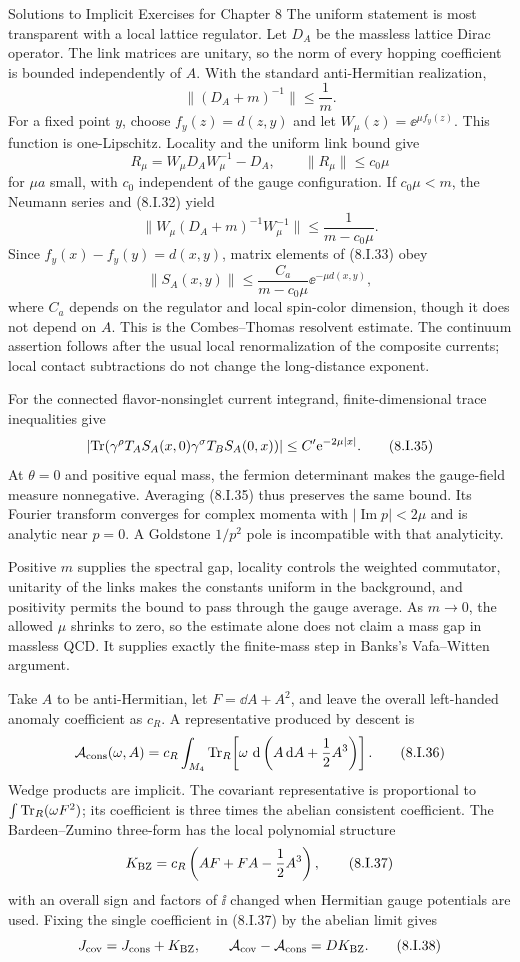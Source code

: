 \begin{bankssolutions}{Solutions to Implicit Exercises for Chapter 8}
The uniform statement is most transparent with a local lattice regulator.
Let $D_A$ be the massless lattice Dirac operator.  The link matrices are
unitary, so the norm of every hopping coefficient is bounded independently
of $A$.  With the standard anti-Hermitian realization,
\[
 \|(D_A+m)^{-1}\|\le\frac1m. \tag{8.I.32}
\]
For a fixed point $y$, choose $f_y(z)=d(z,y)$ and let
$W_\mu(z)=\ee^{\mu f_y(z)}$.  This function is one-Lipschitz.  Locality and
the uniform link bound give
\[
 R_\mu=W_\mu D_AW_\mu^{-1}-D_A,
 \qquad \|R_\mu\|\le c_0\mu
\]
for $\mu a$ small, with $c_0$ independent of the gauge configuration.  If
$c_0\mu<m$, the Neumann series and (8.I.32) yield
\[
 \|W_\mu(D_A+m)^{-1}W_\mu^{-1}\|
 \le\frac1{m-c_0\mu}. \tag{8.I.33}
\]
Since $f_y(x)-f_y(y)=d(x,y)$, matrix elements of (8.I.33) obey
\[
 \|S_A(x,y)\|\le\frac{C_a}{m-c_0\mu}
 \ee^{-\mu d(x,y)}, \tag{8.I.34}
\]
where $C_a$ depends on the regulator and local spin-color dimension, though
it does not depend on $A$.  This is the Combes--Thomas resolvent estimate.
The continuum assertion follows after the usual local renormalization of the
composite currents; local contact subtractions do not change the
long-distance exponent.

For the connected flavor-nonsinglet current integrand, finite-dimensional
trace inequalities give
\[
 \left|\operatorname{Tr}(\gamma^\rho T_AS_A(x,0)
 \gamma^\sigma T_BS_A(0,x))\right|
 \le C'\mathrm{e}^{-2\mu|x|}. \tag{8.I.35}
\]
At $\theta=0$ and positive equal mass, the fermion determinant makes the
gauge-field measure nonnegative.  Averaging (8.I.35) thus preserves the same
bound.  Its Fourier transform converges for complex momenta with
$|\operatorname{Im}p|<2\mu$ and is analytic near $p=0$.  A Goldstone
$1/p^2$ pole is incompatible with that analyticity.

Positive $m$ supplies the spectral gap, locality controls the weighted
commutator, unitarity of the links makes the constants uniform in the
background, and positivity permits the bound to pass through the gauge
average.  As $m\to0$, the allowed $\mu$ shrinks to zero, so the estimate alone
does not claim a mass gap in massless QCD\@.  It supplies exactly the finite-mass
step in Banks's Vafa--Witten argument.

Take $A$ to be anti-Hermitian, let $F=\dd A+A^2$, and leave the overall
left-handed anomaly coefficient as $c_R$.  A representative produced by
descent is
\[
 \mathcal A_{\rm cons}(\omega,A)
 =c_R\int_{M_4}\operatorname{Tr}_R\!\left[
 \omega\,\mathop{}\!\mathrm{d}\left(A\mathop{}\!\mathrm{d} A+\frac12A^3\right)\right].
 \tag{8.I.36}
\]
Wedge products are implicit.  The covariant representative is proportional
to $\int\operatorname{Tr}_R(\omega F^2)$; its coefficient is three times the abelian
consistent coefficient.  The Bardeen--Zumino three-form has the local
polynomial structure
\[
 K_{\rm BZ}=c_R\left(AF+FA-\frac12A^3\right), \tag{8.I.37}
\]
with an overall sign and factors of $\ii$ changed when Hermitian gauge
potentials are used.  Fixing the single coefficient in (8.I.37) by the
abelian limit gives
\[
 J_{\rm cov}=J_{\rm cons}+K_{\rm BZ},
 \qquad
 \mathcal A_{\rm cov}-\mathcal A_{\rm cons}=D K_{\rm BZ}. \tag{8.I.38}
\]


\end{bankssolutions}
